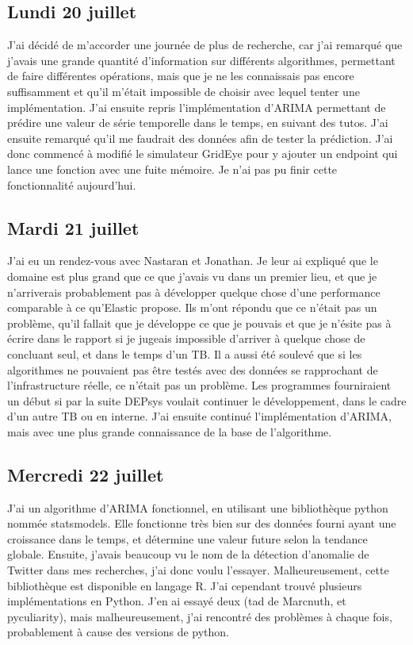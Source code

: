 \documentclass[paper=a4, fontsize=11pt]{scrartcl}
\begin{document}
\subsection{Lundi 20 juillet}
    J'ai décidé de m'accorder une journée de plus de recherche, car j'ai remarqué que j'avais une grande quantité d'information sur différents algorithmes, permettant de faire différentes opérations, mais que je ne les connaissais pas encore suffisamment et qu'il m'était impossible de choisir avec lequel tenter une implémentation. J'ai ensuite repris l'implémentation d'ARIMA permettant de prédire une valeur de série temporelle dans le temps, en suivant des tutos. J'ai ensuite remarqué qu'il me faudrait des données afin de tester la prédiction. J'ai donc commencé à modifié le simulateur GridEye pour y ajouter un endpoint qui lance une fonction avec une fuite mémoire. Je n'ai pas pu finir cette fonctionnalité aujourd'hui.
\subsection{Mardi 21 juillet}
    J'ai eu un rendez-vous avec Nastaran et Jonathan. Je leur ai expliqué que le domaine est plus grand que ce que j'avais vu dans un premier lieu, et que je n'arriverais probablement pas à développer quelque chose d'une performance comparable à ce qu'Elastic propose. Ils m'ont répondu que ce n'était pas un problème, qu'il fallait que je développe ce que je pouvais et que je n'ésite pas à écrire dans le rapport si je jugeais impossible d'arriver à quelque chose de concluant seul, et dans le temps d'un TB. Il a aussi été soulevé que si les algorithmes ne pouvaient pas être testés avec des données se rapprochant de l'infrastructure réelle, ce n'était pas un problème. Les programmes fourniraient un début si par la suite DEPsys voulait continuer le développement, dans le cadre d'un autre TB ou en interne. J'ai ensuite continué l'implémentation d'ARIMA, mais avec une plus grande connaissance de la base de l'algorithme.
\subsection{Mercredi 22 juillet}
    J'ai un algorithme d'ARIMA fonctionnel, en utilisant une bibliothèque python nommée statsmodels. Elle fonctionne très bien sur des données fourni ayant une croissance dans le temps, et détermine une valeur future selon la tendance globale. Ensuite, j'avais beaucoup vu le nom de la détection d'anomalie de Twitter dans mes recherches, j'ai donc voulu l'essayer. Malheureusement, cette bibliothèque est disponible en langage R. J'ai cependant trouvé plusieurs implémentations en Python. J'en ai essayé deux (tad de Marcnuth, et pyculiarity), mais malheureusement, j'ai rencontré des problèmes à chaque fois, probablement à cause des versions de python.
\end{document}
